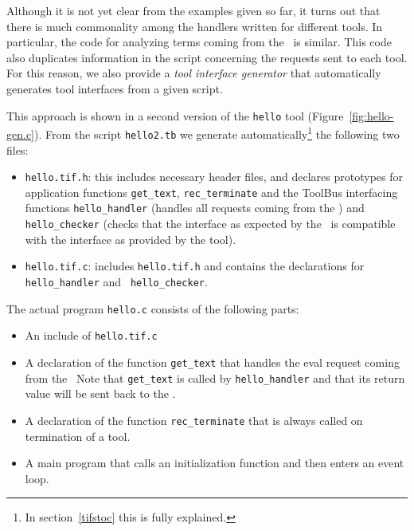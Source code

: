 \documentclass[twoside]{article} %
\begin{document}
Although it is not yet clear from the examples given so far,
it turns out that there is much commonality among the handlers
written for different tools. In particular, the code for analyzing
terms coming from the \TB\ is similar. This code also duplicates
information in the script concerning the requests sent to each tool.
For this reason, we also provide a {\em tool interface generator}
that automatically generates tool interfaces from a given script.

This approach is shown in a second version of
the {\tt hello} tool (Figure~\ref{fig:hello-gen.c}).
From the script {\tt hello2.tb} we generate automatically\footnote{In
  section~\ref{tifstoc} this is fully explained.} the following two files:

\begin{itemize}
  
\item {\tt hello.tif.h}: this includes necessary header files, and declares
  prototypes for application functions {\tt get\_text}, {\tt rec\_terminate} and
  the ToolBus interfacing functions {\tt hello\_handler} (handles all requests
  coming from the \TB) and {\tt hello\_checker} (checks that the interface as
  expected by the \TB\ is compatible with the interface as provided by the
  tool).  %
  
\item \begin{sloppypar} {\tt hello.tif.c}: includes {\tt hello.tif.h} and
    contains the declarations for {\tt hello\_handler} and {\tt
      hello\_checker}.
    \end{sloppypar}

\end{itemize}

The actual program {\tt hello.c} consists of the following parts:
\begin{itemize}
\item An include of {\tt hello.tif.c}

\item A declaration of the function {\tt get\_text} that handles the
eval request coming from the \TB\ 
Note that {\tt get\_text} is called by {\tt hello\_handler} and that
its return value will be sent back to the \TB.

\item A declaration of the function {\tt rec\_terminate} that is always
  called on termination of a tool.

\item A main program that calls an initialization function and
then enters an event loop.

\end{itemize}
\end{document}
